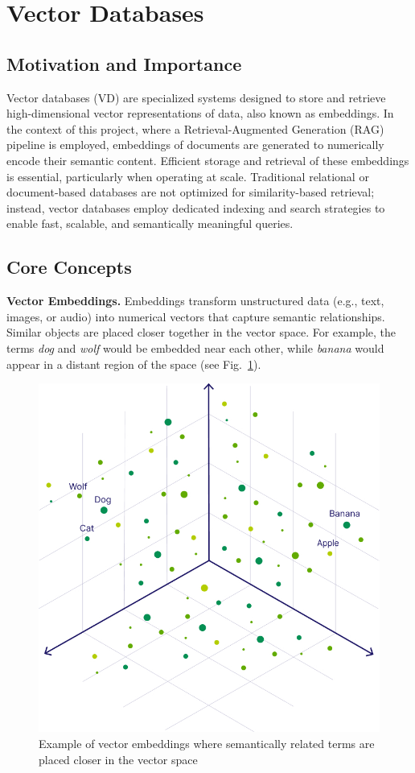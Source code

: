\section{Vector Databases}
\label{sec:vector-databases}

\subsection{Motivation and Importance}
Vector databases (\ac{VD}) are specialized systems designed to store and retrieve high-dimensional vector representations of data, also known as embeddings. In the context of this project, where a Retrieval-Augmented Generation (\ac{RAG}) pipeline is employed, embeddings of documents are generated to numerically encode their semantic content. Efficient storage and retrieval of these embeddings is essential, particularly when operating at scale. Traditional relational or document-based databases are not optimized for similarity-based retrieval; instead, vector databases employ dedicated indexing and search strategies to enable fast, scalable, and semantically meaningful queries.

\subsection{Core Concepts}

\hspace*{1em} \textbf{Vector Embeddings.}  
Embeddings transform unstructured data (e.g., text, images, or audio) into numerical vectors that capture semantic relationships. Similar objects are placed closer together in the vector space. For example, the terms \emph{dog} and \emph{wolf} would be embedded near each other, while \emph{banana} would appear in a distant region of the space (see Fig.~\ref{fig:vector-embedding}).  

\begin{figure}[h]
    \centering
    \includegraphics[width=0.55\linewidth]{Images/vector-embedding.jpg}
    \caption{Example of vector embeddings where semantically related terms are placed closer in the vector space}
    \label{fig:vector-embedding}
\end{figure}

